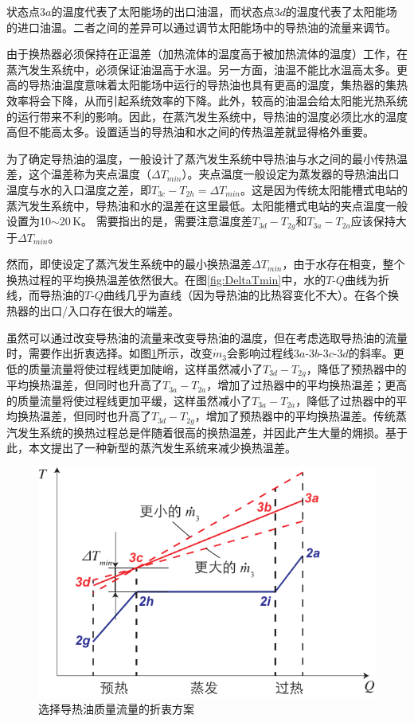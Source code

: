 状态点$3a$的温度代表了太阳能场的出口油温，而状态点$3d$的温度代表了太阳能场的进口油温。二者之间的差异可以通过调节太阳能场中的导热油的流量来调节。

由于换热器必须保持在正温差（加热流体的温度高于被加热流体的温度）工作，在蒸汽发生系统中，必须保证油温高于水温。另一方面，油温不能比水温高太多。更高的导热油温度意味着太阳能场中运行的导热油也具有更高的温度，集热器的集热效率将会下降，从而引起系统效率的下降。此外，较高的油温会给太阳能光热系统的运行带来不利的影响。因此，在蒸汽发生系统中，导热油的温度必须比水的温度高但不能高太多。设置适当的导热油和水之间的传热温差就显得格外重要。

为了确定导热油的温度，一般设计了蒸汽发生系统中导热油与水之间的最小传热温差，这个温差称为夹点温度（$\Delta T_{min}$）。夹点温度一般设定为蒸发器的导热油出口温度与水的入口温度之差，即$T_{3c} - T_{2h} = \Delta T_{min}$。这是因为传统太阳能槽式电站的蒸汽发生系统中，导热油和水的温差在这里最低。太阳能槽式电站的夹点温度一般设置为10$\sim$20$\,\mathrm{K}$。
需要指出的是，需要注意温度差$T_{3d} - T_{2g}$和$T_{3a} - T_{2a}$应该保持大于$\Delta T_{min}$。

然而，即使设定了蒸汽发生系统中的最小换热温差$\Delta T_{min}$，由于水存在相变，整个换热过程的平均换热温差依然很大。在图\ref{fig:DeltaTmin}中，水的$T$-$Q$曲线为折线，而导热油的$T$-$Q$曲线几乎为直线（因为导热油的比热容变化不大）。在各个换热器的出口/入口存在很大的端差。

虽然可以通过改变导热油的流量来改变导热油的温度，但在考虑选取导热油的流量时，需要作出折衷选择。如图\ref{fig:DeltaT}所示，改变$\dot{m}_3$会影响过程线$3a$-$3b$-$3c$-$3d$的斜率。更低的质量流量将使过程线更加陡峭，这样虽然减小了$T_{3d} - T_{2g}$，降低了预热器中的平均换热温差，但同时也升高了$T_{3a} - T_{2a}$，增加了过热器中的平均换热温差；更高的质量流量将使过程线更加平缓，这样虽然减小了$T_{3a} - T_{2a}$，降低了过热器中的平均换热温差，但同时也升高了$T_{3d} - T_{2g}$，增加了预热器中的平均换热温差。传统蒸汽发生系统的换热过程总是伴随着很高的换热温差，并因此产生大量的㶲损。基于此，本文提出了一种新型的蒸汽发生系统来减少换热温差。

\noindent \begin{figure}[htbp]
\begin{center}
	\includegraphics[width = 0.5\columnwidth]{fig/DeltaT}
	\caption{选择导热油质量流量的折衷方案}
	\label{fig:DeltaT}
\end{center}
\end{figure}

